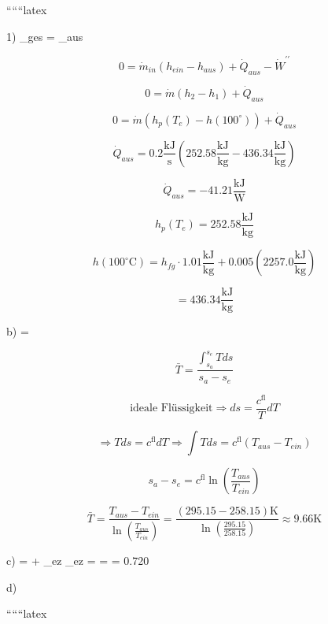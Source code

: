 
``````latex


1) \quad {}_{ges} = _{aus}

\[
0 = \dot{m}_{in} (h_{ein} - h_{aus}) + \dot{Q}_{aus} - \dot{W}^{\prime \prime}
\]

\[
0 = \dot{m} (h_{2} - h_{1}) + \dot{Q}_{aus}
\]

\[
0 = \dot{m} (h_{p}(T_{e}) - h(100^{\circ})) + \dot{Q}_{aus}
\]

\[
\dot{Q}_{aus} = 0.2 \frac{\text{kJ}}{\text{s}} (252.58 \frac{\text{kJ}}{\text{kg}} - 436.34 \frac{\text{kJ}}{\text{kg}})
\]

\[
\dot{Q}_{aus} = -41.21 \frac{\text{kJ}}{\text{W}}
\]

\[
h_{p}(T_{e}) = 252.58 \frac{\text{kJ}}{\text{kg}}
\]

\[
h(100^{\circ} \text{C}) = h_{fg} \cdot 1.01 \frac{\text{kJ}}{\text{kg}} + 0.005 (2257.0 \frac{\text{kJ}}{\text{kg}})
\]

\[
= 436.34 \frac{\text{kJ}}{\text{kg}}
\]

b) \quad {} = 

\[
\bar{T} = \frac{\int_{s_{a}}^{s_{e}} T ds}{s_{a} - s_{e}}
\]

\[
\text{ideale Flüssigkeit} \Rightarrow ds = \frac{c^{\text{fl}}}{T} dT
\]

\[
\Rightarrow T ds = c^{\text{fl}} dT \Rightarrow \int T ds = c^{\text{fl}} (T_{aus} - T_{ein})
\]

\[
s_{a} - s_{e} = c^{\text{fl}} \ln \left( \frac{T_{aus}}{T_{ein}} \right)
\]

\[
\bar{T} = \frac{T_{aus} - T_{ein}}{\ln \left( \frac{T_{aus}}{T_{ein}} \right)} = \frac{(295.15 - 258.15) \text{K}}{\ln \left( \frac{295.15}{258.15} \right)} \approx 9.66 \text{K}
\]

c)  =  + _{ez} \Rightarrow {}_{ez} =  =  = 0.720 

d)

``````latex


